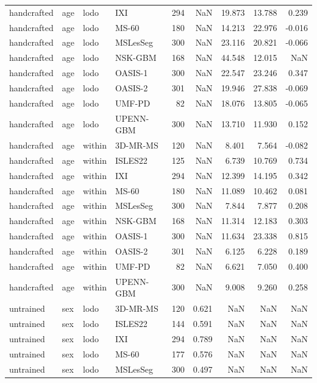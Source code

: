 \begin{tabular}{llllrrrrr}
handcrafted & age & lodo & IXI & 294 & NaN & 19.873 & 13.788 & 0.239 \\
handcrafted & age & lodo & MS-60 & 180 & NaN & 14.213 & 22.976 & -0.016 \\
handcrafted & age & lodo & MSLesSeg & 300 & NaN & 23.116 & 20.821 & -0.066 \\
handcrafted & age & lodo & NSK-GBM & 168 & NaN & 44.548 & 12.015 & NaN \\
handcrafted & age & lodo & OASIS-1 & 300 & NaN & 22.547 & 23.246 & 0.347 \\
handcrafted & age & lodo & OASIS-2 & 301 & NaN & 19.946 & 27.838 & -0.069 \\
handcrafted & age & lodo & UMF-PD & 82 & NaN & 18.076 & 13.805 & -0.065 \\
handcrafted & age & lodo & UPENN-GBM & 300 & NaN & 13.710 & 11.930 & 0.152 \\
handcrafted & age & within & 3D-MR-MS & 120 & NaN & 8.401 & 7.564 & -0.082 \\
handcrafted & age & within & ISLES22 & 125 & NaN & 6.739 & 10.769 & 0.734 \\
handcrafted & age & within & IXI & 294 & NaN & 12.399 & 14.195 & 0.342 \\
handcrafted & age & within & MS-60 & 180 & NaN & 11.089 & 10.462 & 0.081 \\
handcrafted & age & within & MSLesSeg & 300 & NaN & 7.844 & 7.877 & 0.208 \\
handcrafted & age & within & NSK-GBM & 168 & NaN & 11.314 & 12.183 & 0.303 \\
handcrafted & age & within & OASIS-1 & 300 & NaN & 11.634 & 23.338 & 0.815 \\
handcrafted & age & within & OASIS-2 & 301 & NaN & 6.125 & 6.228 & 0.189 \\
handcrafted & age & within & UMF-PD & 82 & NaN & 6.621 & 7.050 & 0.400 \\
handcrafted & age & within & UPENN-GBM & 300 & NaN & 9.008 & 9.260 & 0.258 \\
untrained & sex & lodo & 3D-MR-MS & 120 & 0.621 & NaN & NaN & NaN \\
untrained & sex & lodo & ISLES22 & 144 & 0.591 & NaN & NaN & NaN \\
untrained & sex & lodo & IXI & 294 & 0.789 & NaN & NaN & NaN \\
untrained & sex & lodo & MS-60 & 177 & 0.576 & NaN & NaN & NaN \\
untrained & sex & lodo & MSLesSeg & 300 & 0.497 & NaN & NaN & NaN \\

\end{tabular}
